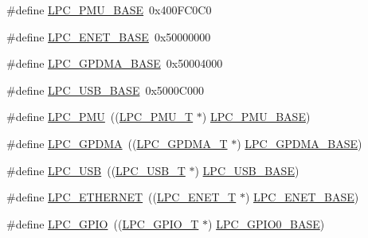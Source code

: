 \begin{DoxyCompactItemize}
\item 
\#define \hyperlink{group__PERIPH__175X__6X__BASE_ga865bed8ad61e9e273439ad1349a46d68}{L\-P\-C\-\_\-\-P\-M\-U\-\_\-\-B\-A\-S\-E}~0x400\-F\-C0\-C0
\item 
\#define \hyperlink{group__PERIPH__175X__6X__BASE_ga73c18d53000abe3814c4b787cd83a57c}{L\-P\-C\-\_\-\-E\-N\-E\-T\-\_\-\-B\-A\-S\-E}~0x50000000
\item 
\#define \hyperlink{group__PERIPH__175X__6X__BASE_ga51ba8e3f33730fa2b78be3f892d8c278}{L\-P\-C\-\_\-\-G\-P\-D\-M\-A\-\_\-\-B\-A\-S\-E}~0x50004000
\item 
\#define \hyperlink{group__PERIPH__175X__6X__BASE_gaa619008881e9f76dc31131313eff1b79}{L\-P\-C\-\_\-\-U\-S\-B\-\_\-\-B\-A\-S\-E}~0x5000\-C000
\item 
\#define \hyperlink{group__PERIPH__175X__6X__BASE_ga9d540cc313db00679c10f9ac1961b06a}{L\-P\-C\-\_\-\-P\-M\-U}~((\hyperlink{structLPC__PMU__T}{L\-P\-C\-\_\-\-P\-M\-U\-\_\-\-T}              $\ast$) \hyperlink{group__PERIPH__407X__8X__BASE_ga865bed8ad61e9e273439ad1349a46d68}{L\-P\-C\-\_\-\-P\-M\-U\-\_\-\-B\-A\-S\-E})
\item 
\#define \hyperlink{group__PERIPH__175X__6X__BASE_gaf9d4b843ddff8d08a27880f90e2dbf18}{L\-P\-C\-\_\-\-G\-P\-D\-M\-A}~((\hyperlink{structLPC__GPDMA__T}{L\-P\-C\-\_\-\-G\-P\-D\-M\-A\-\_\-\-T}            $\ast$) \hyperlink{group__PERIPH__407X__8X__BASE_ga51ba8e3f33730fa2b78be3f892d8c278}{L\-P\-C\-\_\-\-G\-P\-D\-M\-A\-\_\-\-B\-A\-S\-E})
\item 
\#define \hyperlink{group__PERIPH__175X__6X__BASE_gae77538a7f3f4850715c95283e38b423f}{L\-P\-C\-\_\-\-U\-S\-B}~((\hyperlink{structLPC__USB__T}{L\-P\-C\-\_\-\-U\-S\-B\-\_\-\-T}              $\ast$) \hyperlink{group__PERIPH__407X__8X__BASE_gaa619008881e9f76dc31131313eff1b79}{L\-P\-C\-\_\-\-U\-S\-B\-\_\-\-B\-A\-S\-E})
\item 
\#define \hyperlink{group__PERIPH__175X__6X__BASE_gaddb977e4442891b21ced3344c71440d7}{L\-P\-C\-\_\-\-E\-T\-H\-E\-R\-N\-E\-T}~((\hyperlink{structLPC__ENET__T}{L\-P\-C\-\_\-\-E\-N\-E\-T\-\_\-\-T}             $\ast$) \hyperlink{group__PERIPH__407X__8X__BASE_ga73c18d53000abe3814c4b787cd83a57c}{L\-P\-C\-\_\-\-E\-N\-E\-T\-\_\-\-B\-A\-S\-E})
\item 
\#define \hyperlink{group__PERIPH__175X__6X__BASE_ga8fce6a072685922bf3ebc1aa9070f408}{L\-P\-C\-\_\-\-G\-P\-I\-O}~((\hyperlink{structLPC__GPIO__T}{L\-P\-C\-\_\-\-G\-P\-I\-O\-\_\-\-T}             $\ast$) \hyperlink{group__PERIPH__407X__8X__BASE_ga09e0e964ea1abf3b991772df2aa52405}{L\-P\-C\-\_\-\-G\-P\-I\-O0\-\_\-\-B\-A\-S\-E})

\end{DoxyCompactItemize}
